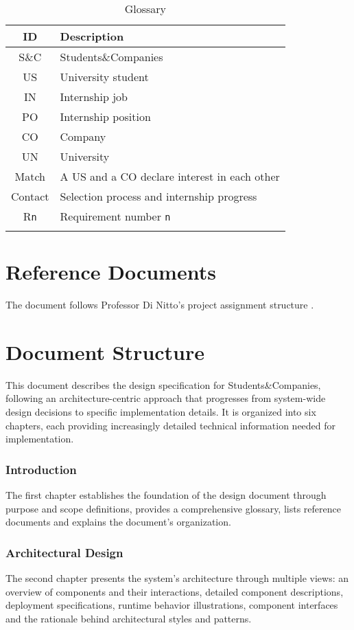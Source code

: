 \renewcommand{\arraystretch}{1.5}
\begin{longtable}{|c|p{8.5cm}|}
    \hline \rowcolor{polimiblue!40}
    \textbf{ID} & \textbf{Description} \\ \hline
    S\&C & Students\&Companies \\ \hline
    US & University student \\ \hline
    IN & Internship job \\ \hline
    PO & Internship position \\ \hline
    CO & Company \\ \hline
    UN & University \\ \hline
    Match & A US and a CO declare interest in each other \\ \hline
    Contact & Selection process and internship progress \\ \hline
    R\texttt{n} & Requirement number \texttt{n} \\ \hline
\caption{Glossary}
\end{longtable}

\section{Reference Documents}
The document follows Professor Di Nitto's project assignment structure \cite{dinitto2024}.

\section{Document Structure}
This document describes the design specification for Students\&Companies, following an architecture-centric approach that progresses from system-wide design decisions to specific implementation details.
It is organized into six chapters, each providing increasingly detailed technical information needed for implementation.

\subsubsection{Introduction}
The first chapter establishes the foundation of the design document through purpose and scope definitions, provides a comprehensive glossary, lists reference documents and explains the document's organization.

\subsubsection{Architectural Design}
The second chapter presents the system's architecture through multiple views: an overview of components and their interactions, detailed component descriptions, deployment specifications, runtime behavior illustrations, component interfaces and the rationale behind architectural styles and patterns.


